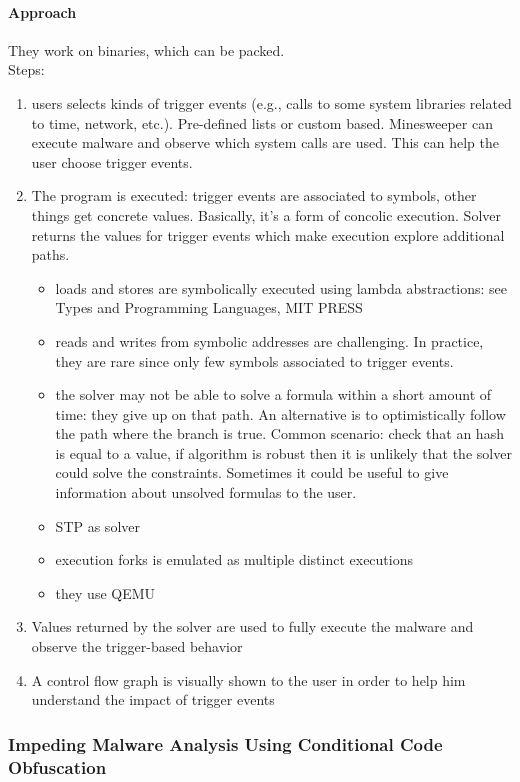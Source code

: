 \paragraph{Approach}
They work on binaries, which can be packed.\\

Steps:
\begin{enumerate}
  \item users selects kinds of trigger events (e.g., calls to some system libraries related to time, network, etc.). Pre-defined lists or custom based. Minesweeper can execute malware and observe which system calls are used. This can help the user choose trigger events.
  \item The program is executed: trigger events are associated to symbols, other things get concrete values. Basically, it's a form of concolic execution. Solver returns the values for trigger events which make execution explore additional paths.
    \begin{itemize}
      \item loads and stores are symbolically executed using lambda abstractions: see Types and Programming Languages, MIT PRESS
      \item reads and writes from symbolic addresses are challenging. In practice, they are rare since only few symbols associated to trigger events.
      \item the solver may not be able to solve a formula within a short amount of time: they give up on that path. An alternative is to optimistically follow the path where the branch is true. Common scenario: check that an hash is equal to a value, if algorithm is robust then it is unlikely that the solver could solve the constraints. Sometimes it could be useful to give information about unsolved formulas to the user.
      \item STP as solver
      \item execution forks is emulated as multiple distinct executions
      \item they use QEMU
    \end{itemize}
  \item Values returned by the solver are used to fully execute the malware and observe the trigger-based behavior
  \item A control flow graph is visually shown to the user in order to help him understand the impact of trigger events
\end{enumerate}

\subsubsection{\cite{SLG-NDSS08} Impeding Malware Analysis Using Conditional Code Obfuscation} 

